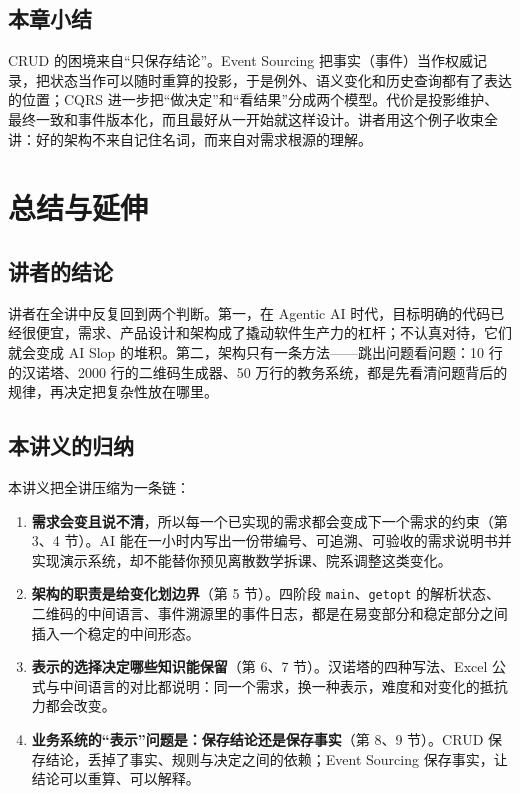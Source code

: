 \documentclass[a4paper]{article}
\begin{document}
\subsection{本章小结}

CRUD 的困境来自“只保存结论”。Event Sourcing 把事实（事件）当作权威记录，把状态当作可以随时重算的投影，于是例外、语义变化和历史查询都有了表达的位置；CQRS 进一步把“做决定”和“看结果”分成两个模型。代价是投影维护、最终一致和事件版本化，而且最好从一开始就这样设计。讲者用这个例子收束全讲：好的架构不来自记住名词，而来自对需求根源的理解。

\section{总结与延伸}

\subsection{讲者的结论}

讲者在全讲中反复回到两个判断。第一，在 Agentic AI 时代，目标明确的代码已经很便宜，需求、产品设计和架构成了撬动软件生产力的杠杆；不认真对待，它们就会变成 AI Slop 的堆积。第二，架构只有一条方法——跳出问题看问题：10 行的汉诺塔、2000 行的二维码生成器、50 万行的教务系统，都是先看清问题背后的规律，再决定把复杂性放在哪里。

\subsection{本讲义的归纳}

本讲义把全讲压缩为一条链：

\begin{enumerate}
  \item \textbf{需求会变且说不清}，所以每一个已实现的需求都会变成下一个需求的约束（第 3、4 节）。AI 能在一小时内写出一份带编号、可追溯、可验收的需求说明书并实现演示系统，却不能替你预见离散数学拆课、院系调整这类变化。
  \item \textbf{架构的职责是给变化划边界}（第 5 节）。四阶段 \texttt{main}、\texttt{getopt} 的解析状态、二维码的中间语言、事件溯源里的事件日志，都是在易变部分和稳定部分之间插入一个稳定的中间形态。
  \item \textbf{表示的选择决定哪些知识能保留}（第 6、7 节）。汉诺塔的四种写法、Excel 公式与中间语言的对比都说明：同一个需求，换一种表示，难度和对变化的抵抗力都会改变。
  \item \textbf{业务系统的“表示”问题是：保存结论还是保存事实}（第 8、9 节）。CRUD 保存结论，丢掉了事实、规则与决定之间的依赖；Event Sourcing 保存事实，让结论可以重算、可以解释。
\end{enumerate}
\end{document}

